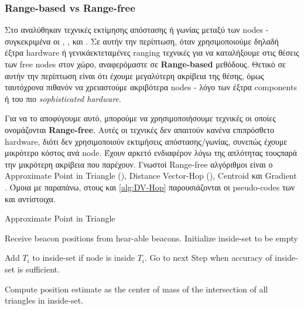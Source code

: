 \subsubsection{Range-based vs Range-free}
Στο  αναλύθηκαν τεχνικές εκτίμησης απόστασης ή γωνίας μεταξύ των nodes - συγκεκριμένα οι
, ,  και .
Σε αυτήν την περίπτωση, όταν χρησιμοποιούμε δηλαδή έξτρα hardware ή γενικά\udot εκτεταμένες ranging τεχνικές 
για να καταλήξουμε στις θέσεις των free nodes στον χώρο, αναφερόμαστε σε \textbf{Range-based} μεθόδους.
Θετικό σε αυτήν την περίπτωση είναι ότι έχουμε μεγαλύτερη ακρίβεια της θέσης, όμως ταυτόχρονα 
πιθανόν να χρειαστούμε ακριβότερα nodes - λόγο των έξτρα components ή του πιο \emph{sophisticated hardware}.  

Για να το αποφύγουμε αυτό, μπορούμε να χρησιμοποιήσουμε τεχνικές οι οποίες ονομάζονται \textbf{Range-free}. 
Αυτές οι τεχνικές δεν απαιτούν κανένα επιπρόσθετο hardware, διότι δεν χρησιμοποιούν εκτιμήσεις απόστασης/γωνίας, συνεπώς έχουμε μικρότερο κόστος ανά node. 
Έχουν αρκετό ενδιαφέρον λόγω της απλότητας τους\udot παρά την μικρότερη ακρίβεια που παρέχουν. Γνωστοί Range-free αλγόριθμοι είναι 
ο Approximate Point in Triangle (), 
Distance Vector-Hop (), Centroid και Gradient \cite{range-distributed}.
Όμοια με παραπάνω, στους  και \ref{alg:DV-Hop} παρουσιάζονται οι pseudo-codes 
των  και  αντίστοιχα.

\begin{algorithm}[H]
	\caption[Approximate Point in Triangle]{Approximate Point in Triangle \cite{localization-algorithms}}\label{alg:APIT}
	\begin{algorithmic}[1]
			\State Receive beacon positions from hear-able beacons.
			\State Initialize inside-set to be empty
			
				\State Add $T_i$ to inside-set if node is inside $T_i$.
					Go to next Step when accuracy
					\newline\hspace*{1.5em}of inside-set is sufficient.
			\EndFor
			
			\State Compute position estimate as the center of mass of the intersection of all 
			\newline triangles in inside-set.	
	\end{algorithmic}
\end{algorithm}

